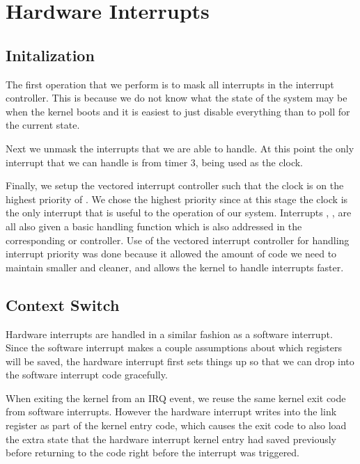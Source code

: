 \documentclass[pdftex,10pt,a4paper]{article}
\begin{document}
\newpage
\section*{Hardware Interrupts}

\subsection*{Initalization}

The first operation that we perform is to mask all interrupts in the
interrupt controller. This is because we do not know what the state of
the system may be when the kernel boots and it is easiest to just
disable everything than to poll for the current state.

Next we unmask the interrupts that we are able to handle. At this
point the only interrupt that we can handle is from timer 3, being
used as the clock.

Finally, we setup the vectored interrupt controller such that the
clock is on the highest priority of . We chose the highest
priority since at this stage the clock is the only interrupt that is
useful to the operation of our system. Interrupts , ,
 are all also given a basic handling function which is also
addressed in the corresponding  or 
controller. Use of the vectored interrupt controller for handling
interrupt priority was done because it allowed the amount of code we
need to maintain smaller and cleaner, and allows the kernel to handle
interrupts faster.

\subsection*{Context Switch}

Hardware interrupts are handled in a similar fashion as a software
interrupt. Since the software interrupt makes a couple assumptions
about which registers will be saved, the hardware interrupt first sets
things up so that we can drop into the software interrupt code
gracefully.

When exiting the kernel from an IRQ event, we reuse the same kernel
exit code from software interrupts. However the hardware interrupt
writes  into the link register as part of the kernel entry
code, which causes the exit code to also load the extra state that the
hardware interrupt kernel entry had saved previously before returning
to the code right before the interrupt was triggered.
\end{document}
